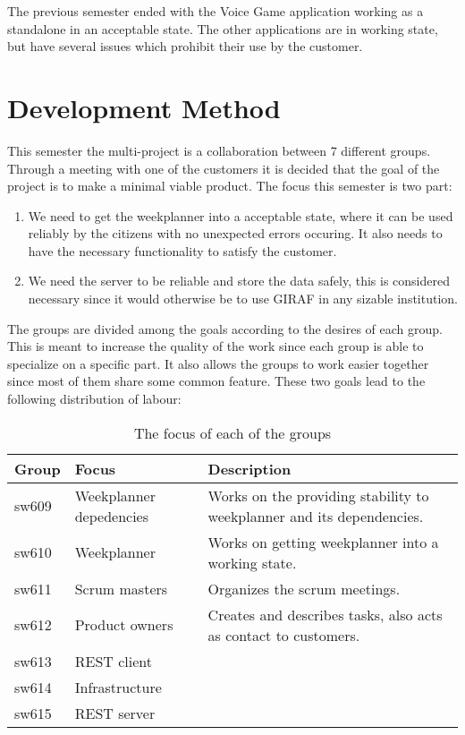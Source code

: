 The previous semester ended with the Voice Game application working as a
standalone in an acceptable state. The other applications are in working state,
but have several issues which prohibit their use by the customer.




\section{Development Method}
This semester the multi-project is a collaboration between 7
different groups. Through a meeting with one of the customers it is
decided that the goal of the project is to make a minimal viable product. The
focus this semester is two part: 
\begin{enumerate}
  \item We need to get the weekplanner into a acceptable state, where it can be
  used reliably by the citizens with no unexpected errors occuring. It also
  needs to have the necessary functionality to satisfy the customer.
  \item We need the server to be reliable and store the data safely, this is
  considered necessary since it would otherwise be to use GIRAF in any sizable
  institution.
\end{enumerate}

The groups are divided among the goals according to the desires of each
group. This is meant to increase the quality of the work since each group is
able to specialize on a specific part. It also allows the groups to work easier
together since most of them share some common feature. These two goals lead to
the following distribution of labour:

\begin{table}[H]
\centering
\begin{tabular}{|p{1cm}|p{3cm}|p{8cm}|}
\hline
Group & Focus & Description \\ \hline
sw609 & Weekplanner depedencies & Works on the providing stability to
weekplanner and its dependencies.\\\hline 
sw610 & Weekplanner & Works on getting weekplanner into a working
state.\\
\hline sw611 & Scrum masters & Organizes the scrum meetings. \\\hline 
sw612 & Product owners & Creates and describes tasks, also acts as contact to
customers. \\\hline 
sw613 & REST client & \\ \hline

sw614 & Infrastructure & \\ \hline

sw615 & REST server & \\ \hline

\end{tabular}
\caption{The focus of each of the groups}
\label{GroupDivision}
\end{table}

